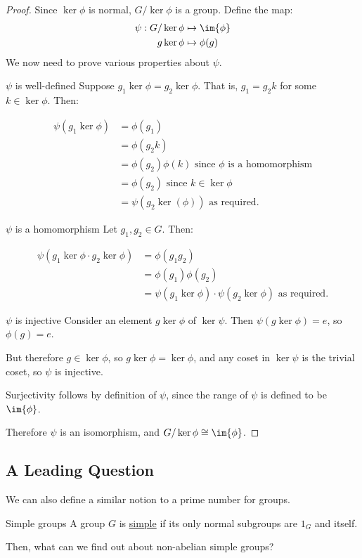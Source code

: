 \documentclass[../Main.tex]{subfiles}
\begin{document}
\begin{proof}
    Since $\ker{\phi}$ is normal, $G / \ker{\phi}$ is a group. Define the map:
    \begin{align*}
        \psi : G / \ker{\phi} &\mapsto \im{\phi} \\
        g \ker{\phi} &\mapsto \phi(g)
    \end{align*}
    We now need to prove various properties about $\psi$.
    \begin{subproof}{$\psi$ is well-defined}
        Suppose $g_1 \ker{\phi} = g_2 \ker{\phi}$. That is, $g_1 = g_2 k$ for some $k \in \ker{\phi}$. Then:\par
        \begin{align*}
            \psi(g_1 \ker{\phi}) &= \phi(g_1) \\
            &= \phi(g_2 k) \\
            &= \phi(g_2) \phi(k) \text{ since } \phi \text{ is a homomorphism} \\
            &= \phi(g_2) \text{ since } k \in \ker{\phi} \\
            &= \psi(g_2 \ker(\phi)) \text{ as required.}
        \end{align*}
    \end{subproof}
    \begin{subproof}{$\psi$ is a homomorphism}
        Let $g_1, g_2 \in G$. Then:\par
        \begin{align*}
            \psi(g_1 \ker{\phi} \cdot g_2 \ker{\phi}) &= \phi(g_1 g_2) \\
            &= \phi(g_1) \phi(g_2) \\
            &= \psi(g_1 \ker{\phi}) \cdot \psi(g_2 \ker{\phi}) \text{ as required.}
        \end{align*}        
    \end{subproof}
    \begin{subproof}{$\psi$ is injective}
        Consider an element $g \ker{\phi}$ of $\ker{\psi}$. Then $\psi(g \ker{\phi}) = e$, so $\phi(g) = e$.\par
        But therefore $g \in \ker{\phi}$, so $g \ker{\phi} = \ker{\phi}$, and any coset in $\ker{\psi}$ is the trivial coset, so $\psi$ is injective.
    \end{subproof}
    Surjectivity follows by definition of $\psi$, since the range of $\psi$ is defined to be $\im{\phi}$.\par
    Therefore $\psi$ is an isomorphism, and $G / \ker{\phi} \cong \im{\phi}$.
\end{proof}
\subsection{A Leading Question}
We can also define a similar notion to a prime number for groups.
\begin{definition}{Simple groups}
    A group $G$ is \underline{simple} if its only normal subgroups are $1_G$ and itself.
\end{definition}
Then, what can we find out about non-abelian simple groups?
\end{document}
